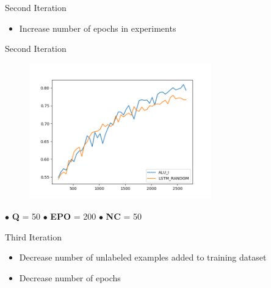 \documentclass[10pt]{beamer}
\begin{document}
\begin{frame}[fragile]{Second Iteration}
\begin{itemize}
    \item Increase number of epochs in experiments
\end{itemize}
\end{frame}

\begin{frame}[fragile]{Second Iteration}
\begin{figure}[H]
    \centering
    \includegraphics[width=0.7\textwidth]{images/acl_n200_comparison}
\end{figure}

\hspace{1.5cm} $\bullet$ \textbf{Q} = 50 \hspace{1cm} $\bullet$ \textbf{EPO} = 200 \hspace{1cm} $\bullet$ \textbf{NC} = 50
\end{frame}

\begin{frame}[fragile]{Third Iteration}
\begin{itemize}
    \item Decrease number of unlabeled examples added to training dataset
    \item Decrease number of epochs
\end{itemize}
\end{frame}
\end{document}
